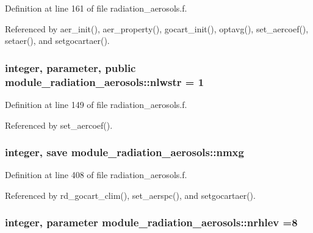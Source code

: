 Definition at line 161 of file radiation\+\_\+aerosols.\+f.



Referenced by aer\+\_\+init(), aer\+\_\+property(), gocart\+\_\+init(), optavg(), set\+\_\+aercoef(), setaer(), and setgocartaer().

\subsubsection[{\texorpdfstring{nlwstr}{nlwstr}}]{\setlength{\rightskip}{0pt plus 5cm}integer, parameter, public module\+\_\+radiation\+\_\+aerosols\+::nlwstr = 1}\hypertarget{namespacemodule__radiation__aerosols_a654ab60d433133542d3c07edd2244566}{}\label{namespacemodule__radiation__aerosols_a654ab60d433133542d3c07edd2244566}


Definition at line 149 of file radiation\+\_\+aerosols.\+f.



Referenced by set\+\_\+aercoef().

\subsubsection[{\texorpdfstring{nmxg}{nmxg}}]{\setlength{\rightskip}{0pt plus 5cm}integer, save module\+\_\+radiation\+\_\+aerosols\+::nmxg\hspace{0.3cm}{\ttfamily [private]}}\hypertarget{namespacemodule__radiation__aerosols_adb4c4cdc8e3212777229d1f54e79bb05}{}\label{namespacemodule__radiation__aerosols_adb4c4cdc8e3212777229d1f54e79bb05}


Definition at line 408 of file radiation\+\_\+aerosols.\+f.



Referenced by rd\+\_\+gocart\+\_\+clim(), set\+\_\+aerspc(), and setgocartaer().

\subsubsection[{\texorpdfstring{nrhlev}{nrhlev}}]{\setlength{\rightskip}{0pt plus 5cm}integer, parameter module\+\_\+radiation\+\_\+aerosols\+::nrhlev =8\hspace{0.3cm}{\ttfamily [private]}}\hypertarget{namespacemodule__radiation__aerosols_aa6d18b0588e80cb40871cc75870d09ba}{}\label{namespacemodule__radiation__aerosols_aa6d18b0588e80cb40871cc75870d09ba}



